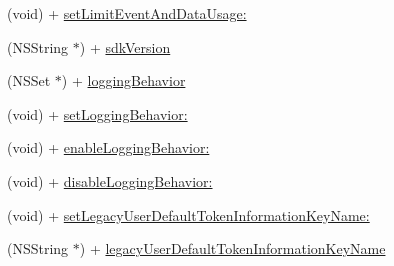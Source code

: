 \begin{DoxyCompactItemize}
(void) + \hyperlink{interface_f_b_s_d_k_settings_a8c62ac10f62c104a0647ba69e7085823}{set\-Limit\-Event\-And\-Data\-Usage\-:}
\item 
(N\-S\-String $\ast$) + \hyperlink{interface_f_b_s_d_k_settings_a02885b9c3912f5b05cfac9595c51bf30}{sdk\-Version}
\item 
(N\-S\-Set $\ast$) + \hyperlink{interface_f_b_s_d_k_settings_ab7265ebde7920533a25cb688f949d351}{logging\-Behavior}
\item 
(void) + \hyperlink{interface_f_b_s_d_k_settings_a54d6982c2cc9d67577210200867f5d80}{set\-Logging\-Behavior\-:}
\item 
(void) + \hyperlink{interface_f_b_s_d_k_settings_a1ba5ba3ae61d2d185c637012f08e134b}{enable\-Logging\-Behavior\-:}
\item 
(void) + \hyperlink{interface_f_b_s_d_k_settings_a06c278bb98ac67a63d49d7a218ea020c}{disable\-Logging\-Behavior\-:}
\item 
(void) + \hyperlink{interface_f_b_s_d_k_settings_a3dfbd0ede9186a774383a44227bd8ffa}{set\-Legacy\-User\-Default\-Token\-Information\-Key\-Name\-:}
\item 
(N\-S\-String $\ast$) + \hyperlink{interface_f_b_s_d_k_settings_a6a3df16d97a6e91f82c69332cbfd8974}{legacy\-User\-Default\-Token\-Information\-Key\-Name}
\end{DoxyCompactItemize}


